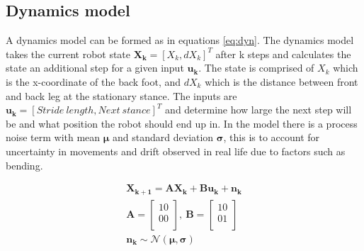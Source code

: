 \documentclass[twoside,twocolumn]{article}
\begin{document}
\subsection{Dynamics model}
A dynamics model can be formed as in equations \ref{eq:dyn}. The dynamics model takes the current robot state $\boldsymbol{X_{k}} = [X_k, dX_k]^T$ after k steps and calculates the state an additional step for a given input $\boldsymbol{u_k}$. The state is comprised of $X_k$ which is the x-coordinate of the back foot, and $dX_k$ which is the distance between front and back leg at the stationary stance. The inputs are $\boldsymbol{u_k} = [Stride \: length, Next \: stance]^T$ and determine how large the next step will be and what position the robot should end up in. In the model there is a process noise term with mean $\boldsymbol{\mu}$ and standard deviation $\boldsymbol{\sigma}$, this is to account for uncertainty in movements and drift observed in real life due to factors such as bending.

\begin{equation}
\begin{split}
\boldsymbol{X_{k+1}} = \boldsymbol{AX_k}+\boldsymbol{Bu_k} + \boldsymbol{n_k}\\
\boldsymbol{A} =
\begin{bmatrix}
1  0 \\
0  0 \\
\end{bmatrix}, \: \boldsymbol{B}=
\begin{bmatrix}
1  0 \\
0  1 \\
\end{bmatrix}\\
\boldsymbol{n_k} \sim \mathcal{N}(\boldsymbol{\mu},\boldsymbol{\sigma}) \\
\end{split}
\label{eq:dyn}
\end{equation}
\end{document}
